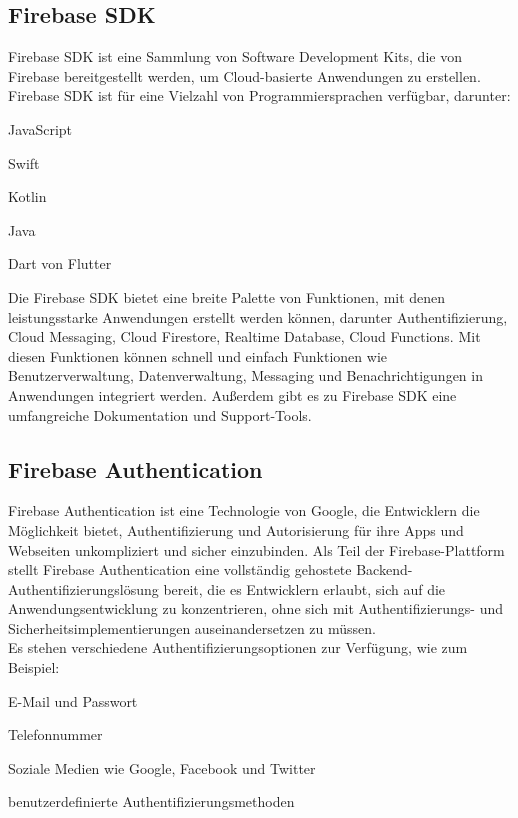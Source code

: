 \subsection{Firebase SDK}
Firebase SDK ist eine Sammlung von Software Development Kits, die von Firebase bereitgestellt werden, um Cloud-basierte Anwendungen zu erstellen.
Firebase SDK ist für eine Vielzahl von Programmiersprachen verfügbar, darunter:
\begin{compactitem}
    \item JavaScript
    \item Swift
    \item Kotlin
    \item Java
    \item Dart von Flutter
\end{compactitem}
Die Firebase SDK bietet eine breite Palette von Funktionen, mit denen leistungsstarke Anwendungen erstellt werden können, darunter Authentifizierung, Cloud Messaging, Cloud Firestore, Realtime Database, Cloud Functions. Mit diesen Funktionen können schnell und einfach Funktionen wie Benutzerverwaltung, Datenverwaltung, Messaging und Benachrichtigungen in Anwendungen integriert werden. Außerdem gibt es zu Firebase SDK eine umfangreiche Dokumentation und Support-Tools.


\subsection{Firebase Authentication}
\author{Sandin Habibovic}

Firebase Authentication ist eine Technologie von Google, die Entwicklern die Möglichkeit bietet, Authentifizierung und Autorisierung für ihre Apps und Webseiten unkompliziert und sicher einzubinden. Als Teil der Firebase-Plattform stellt Firebase Authentication eine vollständig gehostete Backend-Authentifizierungslösung bereit, die es Entwicklern erlaubt, sich auf die Anwendungsentwicklung zu konzentrieren, ohne sich mit Authentifizierungs- und Sicherheitsimplementierungen auseinandersetzen zu müssen.
\\
Es stehen verschiedene Authentifizierungsoptionen zur Verfügung, wie zum Beispiel:
\begin{compactitem}
    \item E-Mail und Passwort
    \item Telefonnummer
    \item Soziale Medien wie Google, Facebook und Twitter
    \item benutzerdefinierte Authentifizierungsmethoden
\end{compactitem}

